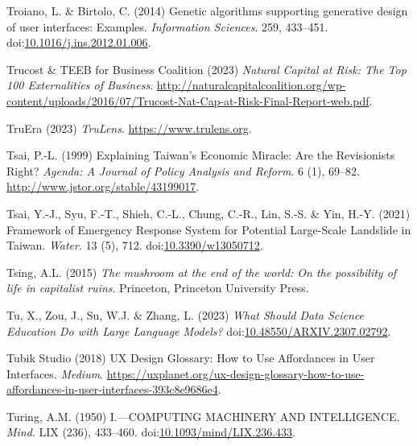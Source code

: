 \documentclass[
  letterpaper,
  DIV=11,
  numbers=noendperiod]{scrartcl}
\newlength{\cslhangindent}
\newenvironment{CSLReferences}[2] %
 {\begin{list}{}{%
  \setlength{\itemindent}{0pt}
  \setlength{\leftmargin}{0pt}
  \setlength{\parsep}{0pt}
  \ifodd #1
   \setlength{\leftmargin}{\cslhangindent}
   \setlength{\itemindent}{-1\cslhangindent}
  \fi
  \setlength{\itemsep}{#2\baselineskip}}}
 {\end{list}}
\begin{document}
\begin{CSLReferences}{0}{1}
Troiano, L. \& Birtolo, C. (2014) Genetic algorithms supporting
generative design of user interfaces: {Examples}. \emph{Information
Sciences}. 259, 433--451.
doi:\href{https://doi.org/10.1016/j.ins.2012.01.006}{10.1016/j.ins.2012.01.006}.

Trucost \& TEEB for Business Coalition (2023) \emph{Natural {Capital} at
{Risk}: {The Top} 100 {Externalities} of {Business}}.
\url{http://naturalcapitalcoalition.org/wp-content/uploads/2016/07/Trucost-Nat-Cap-at-Risk-Final-Report-web.pdf}.

TruEra (2023) \emph{{TruLens}}. \url{https://www.trulens.org}.

Tsai, P.-L. (1999) Explaining {Taiwan}'s {Economic Miracle}: {Are} the
{Revisionists Right}? \emph{Agenda: A Journal of Policy Analysis and
Reform}. 6 (1), 69--82. \url{http://www.jstor.org/stable/43199017}.

Tsai, Y.-J., Syu, F.-T., Shieh, C.-L., Chung, C.-R., Lin, S.-S. \& Yin,
H.-Y. (2021) Framework of {Emergency Response System} for {Potential
Large-Scale Landslide} in {Taiwan}. \emph{Water}. 13 (5), 712.
doi:\href{https://doi.org/10.3390/w13050712}{10.3390/w13050712}.

Tsing, A.L. (2015) \emph{The mushroom at the end of the world: On the
possibility of life in capitalist ruins}. Princeton, Princeton
University Press.

Tu, X., Zou, J., Su, W.J. \& Zhang, L. (2023) \emph{What {Should Data
Science Education Do} with {Large Language Models}?}
doi:\href{https://doi.org/10.48550/ARXIV.2307.02792}{10.48550/ARXIV.2307.02792}.

Tubik Studio (2018) {UX Design Glossary}: {How} to {Use Affordances} in
{User Interfaces}. \emph{Medium}.
\url{https://uxplanet.org/ux-design-glossary-how-to-use-affordances-in-user-interfaces-393c8e9686e4}.

Turing, A.M. (1950) I.---{COMPUTING MACHINERY AND INTELLIGENCE}.
\emph{Mind}. LIX (236), 433--460.
doi:\href{https://doi.org/10.1093/mind/LIX.236.433}{10.1093/mind/LIX.236.433}.


\end{CSLReferences}
\end{document}
